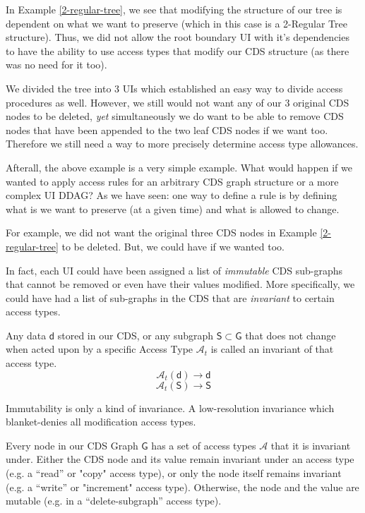 In Example \ref{2-regular-tree}, we see that modifying the structure of our tree is dependent on what we want to preserve (which in this case is a 2-Regular Tree structure). Thus, we did not allow the root boundary UI with it's dependencies to have the ability to use access types that modify our CDS structure (as there was no need for it too).

We divided the tree into 3 UIs which established an easy way to divide access procedures as well. However, we still would not want any of our 3 original CDS nodes to be deleted, \textit{yet} simultaneously we do want to be able to remove CDS nodes that have been appended to the two leaf CDS nodes if we want too. Therefore we still need a way to more precisely determine access type allowances.

Afterall, the above example is a very simple example. What would happen if we wanted to apply access rules for an arbitrary CDS graph structure or a more complex UI DDAG? As we have seen: one way to define a rule is by defining what is we want to preserve (at a given time) and what is allowed to change.

For example, we did not want the original three CDS nodes in Example \ref{2-regular-tree} to be deleted. But, we could have if we wanted too.

In fact, each UI could have been assigned a list of \textit{immutable} CDS sub-graphs that cannot be removed or even have their values modified. More specifically, we could have had a list of sub-graphs in the CDS that are \textit{invariant} to certain access types.

\begin{con-def}[Invariants]
	\label{invariants}
	Any data $\mathsf{d}$ stored in our CDS, or any subgraph $\mathsf{S} \subset \mathsf{G}$ that does not change when acted upon by a specific Access Type $\mathcal{A}_{t}$ is called an invariant of that access type.
	\[ \mathcal{A}_{t}\mathsf{(d)} \rightarrow \mathsf{d} \]
	\[ \mathcal{A}_{t}\mathsf{(S)} \rightarrow \mathsf{S} \]
\end{con-def}

\begin{con-aside}
Immutability is only a kind of invariance. A low-resolution invariance which blanket-denies all modification access types.
\end{con-aside}

Every node in our CDS Graph $\mathsf{G}$ has a set of access types $\mathcal{A}$ that it is invariant under. Either the CDS node and its value remain invariant under an access type (e.g. a ``read'' or "copy" access type), or only the node itself remains invariant (e.g. a ``write'' or "increment" access type). Otherwise, the node and the value are mutable (e.g. in a ``delete-subgraph'' access type).

